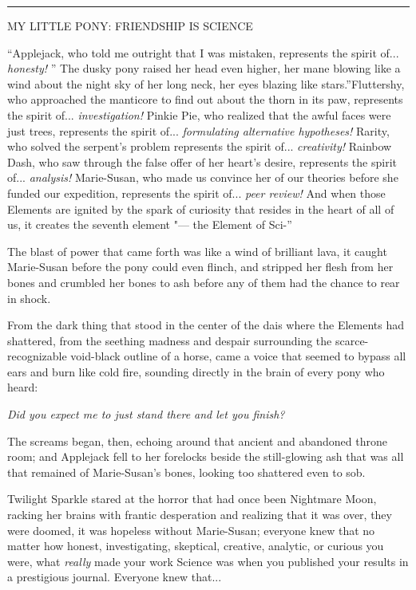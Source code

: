 \begin{center}\rule{3in}{0.4pt}\end{center}

MY LITTLE PONY: FRIENDSHIP IS SCIENCE

``Applejack, who told me outright that I was mistaken, represents the
spirit of... \emph{honesty!} '' The dusky pony raised her head even
higher, her mane blowing like a wind about the night sky of her long
neck, her eyes blazing like stars.''Fluttershy, who approached the
manticore to find out about the thorn in its paw, represents the spirit
of... \emph{investigation!} Pinkie Pie, who realized that the awful
faces were just trees, represents the spirit of...
\emph{formulating alternative hypotheses!} Rarity, who solved the
serpent's problem represents the spirit of... \emph{creativity!}
Rainbow Dash, who saw through the false offer of her heart's desire,
represents the spirit of... \emph{analysis!} Marie-Susan, who made
us convince her of our theories before she funded our expedition,
represents the spirit of... \emph{peer review!} And when those
Elements are ignited by the spark of curiosity that resides in the heart
of all of us, it creates the seventh element "--- the Element of Sci-''

The blast of power that came forth was like a wind of brilliant lava, it
caught Marie-Susan before the pony could even flinch, and stripped her
flesh from her bones and crumbled her bones to ash before any of them
had the chance to rear in shock.

From the dark thing that stood in the center of the dais where the
Elements had shattered, from the seething madness and despair
surrounding the scarce-recognizable void-black outline of a horse, came
a voice that seemed to bypass all ears and burn like cold fire, sounding
directly in the brain of every pony who heard:

\emph{Did you expect me to just stand there and let you finish?}

The screams began, then, echoing around that ancient and abandoned
throne room; and Applejack fell to her forelocks beside the
still-glowing ash that was all that remained of Marie-Susan's bones,
looking too shattered even to sob.

Twilight Sparkle stared at the horror that had once been Nightmare Moon,
racking her brains with frantic desperation and realizing that it was
over, they were doomed, it was hopeless without Marie-Susan; everyone
knew that no matter how honest, investigating, skeptical, creative,
analytic, or curious you were, what \emph{really} made your work Science
was when you published your results in a prestigious journal. Everyone
knew that...


